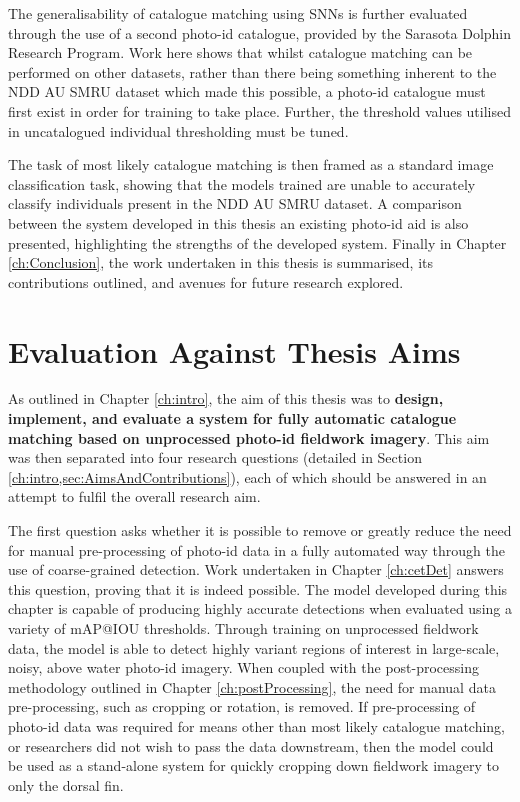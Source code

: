 The generalisability of catalogue matching using SNNs is further evaluated through the use of a second photo-id catalogue, provided by the Sarasota Dolphin Research Program. Work here shows that whilst catalogue matching can be performed on other datasets, rather than there being something inherent to the NDD AU SMRU dataset which made this possible, a photo-id catalogue must first exist in order for training to take place. Further, the threshold values utilised in uncatalogued individual thresholding must be tuned. 

The task of most likely catalogue matching is then framed as a standard image classification task, showing that the models trained are unable to accurately classify individuals present in the NDD AU SMRU dataset. A comparison between the system developed in this thesis an existing photo-id aid is also presented, highlighting the strengths of the developed system. Finally in Chapter \ref{ch:Conclusion}, the work undertaken in this thesis is summarised, its contributions outlined, and avenues for future research explored.

\section{Evaluation Against Thesis Aims}\label{ch:Conclusion,sec:AimsEvaluation}

As outlined in Chapter \ref{ch:intro}, the aim of this thesis was to \textbf{design, implement, and evaluate a system for fully automatic catalogue matching based on unprocessed photo-id fieldwork imagery}. This aim was then separated into four research questions (detailed in Section \ref{ch:intro,sec:AimsAndContributions}), each of which should be answered in an attempt to fulfil the overall research aim. 

The first question asks whether it is possible to remove or greatly reduce the need for manual pre-processing of photo-id data in a fully automated way through the use of coarse-grained detection. Work undertaken in Chapter \ref{ch:cetDet} answers this question, proving that it is indeed possible. The model developed during this chapter is capable of producing highly accurate detections when evaluated using a variety of mAP@IOU thresholds. Through training on unprocessed fieldwork data, the model is able to detect highly variant regions of interest in large-scale, noisy, above water photo-id imagery. When coupled with the post-processing methodology outlined in Chapter \ref{ch:postProcessing}, the need for manual data pre-processing, such as cropping or rotation, is removed. If pre-processing of photo-id data was required for means other than most likely catalogue matching, or researchers did not wish to pass the data downstream, then the model could be used as a stand-alone system for quickly cropping down fieldwork imagery to only the dorsal fin. 

